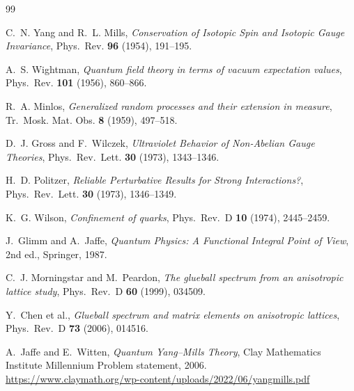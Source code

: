 \documentclass[11pt,a4paper]{article}
\theoremstyle{plain}
\theoremstyle{definition}
\begin{document}
\begin{thebibliography}{99}

C.~N. Yang and R.~L. Mills,
\emph{Conservation of Isotopic Spin and Isotopic Gauge Invariance},
Phys.~Rev. \textbf{96} (1954), 191--195.

A.~S. Wightman,
\emph{Quantum field theory in terms of vacuum expectation values},
Phys.~Rev. \textbf{101} (1956), 860--866.

R.~A. Minlos,
\emph{Generalized random processes and their extension in measure},
Tr.~Mosk. Mat. Obs. \textbf{8} (1959), 497--518.

D.~J. Gross and F.~Wilczek,
\emph{Ultraviolet Behavior of Non-Abelian Gauge Theories},
Phys.~Rev.~Lett. \textbf{30} (1973), 1343--1346.

H.~D. Politzer,
\emph{Reliable Perturbative Results for Strong Interactions?},
Phys.~Rev.~Lett. \textbf{30} (1973), 1346--1349.

K.~G. Wilson,
\emph{Confinement of quarks},
Phys.~Rev.~D \textbf{10} (1974), 2445--2459.

J.~Glimm and A.~Jaffe,
\emph{Quantum Physics: A Functional Integral Point of View},
2nd ed., Springer, 1987.

C.~J. Morningstar and M.~Peardon,
\emph{The glueball spectrum from an anisotropic lattice study},
Phys.~Rev.~D \textbf{60} (1999), 034509.

Y.~Chen et al.,
\emph{Glueball spectrum and matrix elements on anisotropic lattices},
Phys.~Rev.~D \textbf{73} (2006), 014516.

A.~Jaffe and E.~Witten,
\emph{Quantum Yang--Mills Theory},
Clay Mathematics Institute Millennium Problem statement, 2006.\\
\url{https://www.claymath.org/wp-content/uploads/2022/06/yangmills.pdf}

\end{thebibliography}
\end{document}
